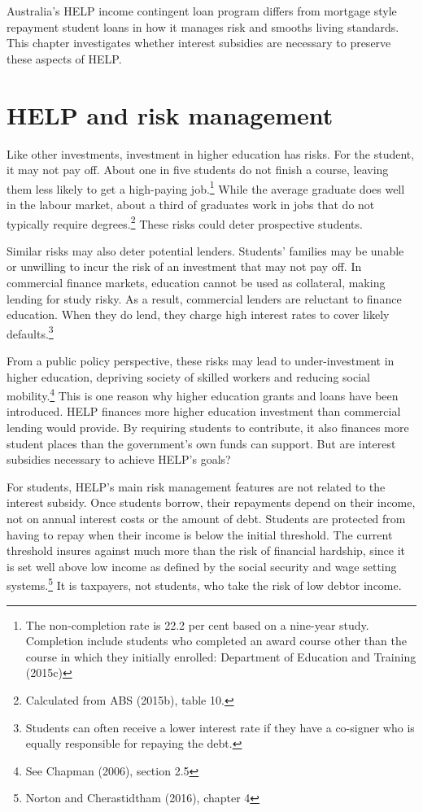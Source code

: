 \documentclass[embargoed]{grattan}
\begin{document}
Australia's HELP income contingent loan program differs from mortgage style repayment student loans in how it manages risk and smooths living standards. This chapter investigates whether interest subsidies are necessary to preserve these aspects of HELP.

\section{HELP and risk management}\label{help-and-risk-management}

Like other investments, investment in higher education has risks. For the student, it may not pay off. About one in five students do not finish a course, leaving them less likely to get a high-paying job.\footnote{The non-completion rate is 22.2 per cent based on a nine-year study. Completion include students who completed an award course other than the course in which they initially enrolled: Department of Education and Training (2015c)} While the average graduate does well in the labour market, about a third of graduates work in jobs that do not typically require degrees.\footnote{Calculated from ABS (2015b), table 10.} These risks could deter prospective students.

Similar risks may also deter potential lenders. Students' families may be unable or unwilling to incur the risk of an investment that may not pay off. In commercial finance markets, education cannot be used as collateral, making lending for study risky. As a result, commercial lenders are reluctant to finance education. When they do lend, they charge high interest rates to cover likely defaults.\footnote{Students can often receive a lower interest rate if they have a co-signer who is equally responsible for repaying the debt.}

From a public policy perspective, these risks may lead to under-investment in higher education, depriving society of skilled workers and reducing social mobility.\footnote{See Chapman (2006), section 2.5} This is one reason why higher education grants and loans have been introduced. HELP finances more higher education investment than commercial lending would provide. By requiring students to contribute, it also finances more student places than the government's own funds can support. But are interest subsidies necessary to achieve HELP's goals?

For students, HELP's main risk management features are not related to the interest subsidy. Once students borrow, their repayments depend on their income, not on annual interest costs or the amount of debt. Students are protected from having to repay when their income is below the initial threshold. The current threshold insures against much more than the risk of financial hardship, since it is set well above low income as defined by the social security and wage setting systems.\footnote{Norton and Cherastidtham (2016), chapter 4} It is taxpayers, not students, who take the risk of low debtor income.
\end{document}
